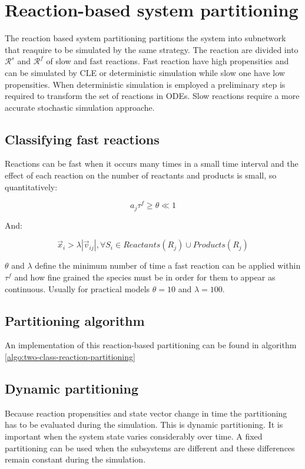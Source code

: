 \section{Reaction-based system partitioning}
The reaction based system partitioning partitions the system into subnetwork that reaquire to be simulated by the same strategy.
The reaction are divided into $\mathcal{R}^s$ and $\mathcal{R}^f$ of slow and fast reactions.
Fast reaction have high propensities and can be simulated by CLE or deterministic simulation while slow one have low propensities.
When deterministic simulation is employed a preliminary step is required to transform the set of reactions in ODEs.
Slow reactions require a more accurate stochastic simulation approache.

  \subsection{Classifying fast reactions}
  Reactions can be fast when it occurs many times in a small time interval and the effect of each reaction on the number of reactants and products is small, so quantitatively:

  $$a_j\tau^f \ge \theta\ll 1$$

  And:

  $$\vec{x}_i > \lambda|\vec{v}_{ij}|, \forall S_i\in Reactants(R_j)\cup Products(R_j)$$

  $\theta$ and $\lambda$ define the minimum number of time a fast reaction can be applied within $\tau^f$ and how fine grained the species must be in order for them to appear as continuous.
Usually for practical models $\theta = 10$ and $\lambda = 100$.

  \subsection{Partitioning algorithm}
  An implementation of this reaction-based partitioning can be found in algorithm \ref{algo:two-class-reaction-partitioning}

  

  \subsection{Dynamic partitioning}
  Because reaction propensities and state vector change in time the partitioning has to be evaluated during the simulation.
  This is dynamic partitioning.
  It is important when the system state varies considerably over time.
  A fixed partitioning can be used  when the subsystems are different and these differences remain constant during the simulation.

